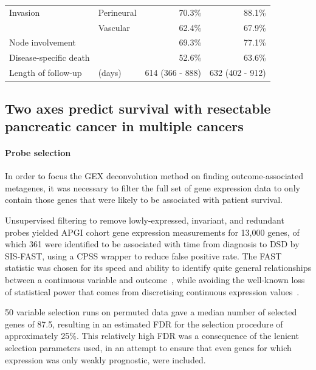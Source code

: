 \documentclass[dissertation.tex]{subfiles}
\begin{document}
\begin{table}[h]
\begin{tabular}{@{}llrr@{}}
Invasion                   & Perineural               & 70.3\%                   & 88.1\%                                                 \\
                           & Vascular                 & 62.4\%                   & 67.9\%                                                 \\
Node involvement           &                          & 69.3\%                   & 77.1\%                                                 \\
Disease-specific death     &                          & 52.6\%                   & 63.6\%                                                 \\
Length of follow-up & (days)                         & 614 (366 - 888)          & 632 (402 - 912)                                       
\end{tabular}
\end{table}

\subsection{Two axes predict survival with resectable pancreatic cancer in multiple cancers}
\paragraph{Probe selection}
In order to focus the \gls{GEX} deconvolution method on finding outcome-associated metagenes, it was necessary to filter the full set of gene expression data to only contain those genes that were likely to be associated with patient survival.

Unsupervised filtering to remove lowly-expressed, invariant, and redundant probes yielded \gls{APGI} cohort gene expression measurements for 13,000 genes, of which 361 were identified to be associated with time from diagnosis to \gls{DSD} by \gls{SIS}-\gls{FAST}, using a \gls{CPSS} wrapper to reduce false positive rate.  The \gls{FAST} statistic was chosen for its speed and ability to identify quite general relationships between a continuous variable and outcome~\cite{Gorst-Rasmussen2013}, while avoiding the well-known loss of statistical power that comes from discretising continuous expression values~\cite{Royston2006}.

50 variable selection runs on permuted data gave a median number of selected genes of 87.5, resulting in an estimated \gls{FDR} for the selection procedure of approximately 25\%.  This relatively high \gls{FDR} was a consequence of the lenient selection parameters used, in an attempt to ensure that even genes for which expression was only weakly prognostic, were included.
\end{document}
